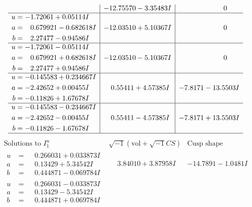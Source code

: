 \documentclass[1p]{elsarticle_modified}
\theoremstyle{definition}
\newcommand{\I}{\sqrt{-1}}
\begin{document}
$$\begin{array}{c|c|c}
 & -12.75570 - 3.35483 I & \phantom{-0.000000 } 0 \\ \hline\begin{aligned}
u &= -1.72061 + 0.05114 I \\
a &= \phantom{-}0.679921 - 0.682618 I \\
b &= \phantom{-}2.27477 - 0.94586 I\end{aligned}
 & -12.03510 + 5.10367 I & \phantom{-0.000000 } 0 \\ \hline\begin{aligned}
u &= -1.72061 - 0.05114 I \\
a &= \phantom{-}0.679921 + 0.682618 I \\
b &= \phantom{-}2.27477 + 0.94586 I\end{aligned}
 & -12.03510 - 5.10367 I & \phantom{-0.000000 } 0 \\ \hline\begin{aligned}
u &= -0.145583 + 0.234667 I \\
a &= -2.42652 + 0.00455 I \\
b &= -0.11826 + 1.67678 I\end{aligned}
 & \phantom{-}0.55411 + 4.57385 I & -7.8171 - 13.5503 I \\ \hline\begin{aligned}
u &= -0.145583 - 0.234667 I \\
a &= -2.42652 - 0.00455 I \\
b &= -0.11826 - 1.67678 I\end{aligned}
 & \phantom{-}0.55411 - 4.57385 I & -7.8171 + 13.5503 I\\
 \hline 
 \end{array}$$\newpage$$\begin{array}{c|c|c}  
\text{Solutions to }I^u_{1}& \I (\text{vol} + \sqrt{-1}CS) & \text{Cusp shape}\\
 \hline 
\begin{aligned}
u &= \phantom{-}0.266031 + 0.033873 I \\
a &= \phantom{-}0.13429 + 5.34542 I \\
b &= \phantom{-}0.444871 - 0.069784 I\end{aligned}
 & \phantom{-}3.84010 + 3.87958 I & -14.7891 - 1.0481 I \\ \hline\begin{aligned}
u &= \phantom{-}0.266031 - 0.033873 I \\
a &= \phantom{-}0.13429 - 5.34542 I \\
b &= \phantom{-}0.444871 + 0.069784 I\end{aligned}

\end{array}$$
\end{document}
